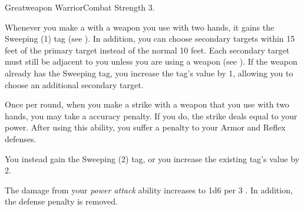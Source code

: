   \begin{feat}{Greatweapon Warrior}{Combat}
    \featpre Strength 3.

     Whenever you make a   with a weapon you use with two hands, it gains the Sweeping (1) tag (see ).
    In addition, you can choose secondary targets within 15 feet of the primary target instead of the normal 10 feet.
    Each secondary target must still be adjacent to you unless you are using a  weapon (see ).
    If the weapon already has the Sweeping tag, you increase the tag's value by 1, allowing you to choose an additional secondary target.

     Once per round, when you make a  strike with a weapon that you use with two hands, you may take a  accuracy penalty.
    If you do, the strike deals  equal to your power.
    After using this ability, you  suffer a  penalty to your Armor and Reflex defenses.

     You instead gain the Sweeping (2) tag, or you increase the existing tag's value by 2.

     The damage from your \textit{power attack} ability increases to 1d6 per 3 .
    In addition, the defense penalty is removed.
  \end{feat}

